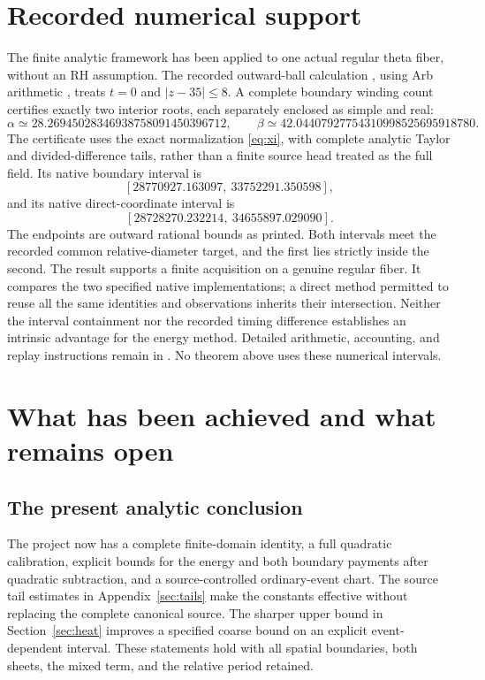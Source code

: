 \section{Recorded numerical support}\label{sec:support}

The finite analytic framework has been applied to one actual regular
theta fiber, without an RH assumption. The recorded outward-ball
calculation \cite{ThetaRecord}, using Arb arithmetic \cite{Arb}, treats
$t=0$ and $|z-35|\le8$. A complete boundary winding count certifies
exactly two interior roots, each separately enclosed as simple and real:
\[
 \alpha\simeq28.26945028346938758091450396712,\qquad
 \beta\simeq42.04407927754310998525695918780.
\]
The certificate uses the exact normalization \eqref{eq:xi}, with complete
analytic Taylor and divided-difference tails, rather than a finite source
head treated as the full field. Its native boundary interval is
\begin{equation}\label{eq:numBoundary}
 [28770927.163097,\ 33752291.350598],
\end{equation}
and its native direct-coordinate interval is
\begin{equation}\label{eq:numDirect}
 [28728270.232214,\ 34655897.029090].
\end{equation}
The endpoints are outward rational bounds as printed. Both intervals
meet the recorded common relative-diameter target, and the first lies
strictly inside the second. The result supports a finite acquisition
on a genuine regular fiber. It compares the two specified native
implementations; a direct method permitted to reuse all the same
identities and observations inherits their intersection. Neither the
interval containment nor the recorded timing difference establishes an
intrinsic advantage for the energy method. Detailed arithmetic,
accounting, and replay instructions remain in \cite{ThetaRecord}.
No theorem above uses these numerical intervals.

\section{What has been achieved and what remains open}\label{sec:open}

\subsection{The present analytic conclusion}
The project now has a complete finite-domain identity, a full quadratic
calibration, explicit bounds for the energy and both boundary payments
after quadratic subtraction, and a source-controlled ordinary-event
chart. The source tail estimates in Appendix~\ref{sec:tails} make the
constants effective without replacing the complete canonical source.
The sharper upper bound in Section~\ref{sec:heat} improves a specified
coarse bound on an explicit event-dependent interval. These statements
hold with all spatial boundaries, both sheets, the mixed term, and the
relative period retained.

